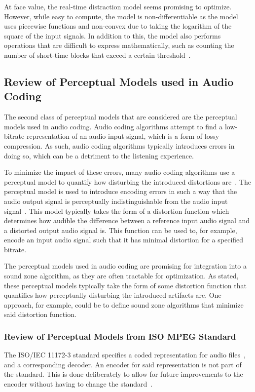 At face value, the real-time distraction model seems promising to optimize.
However, while easy to compute, the model is non-differentiable as the model uses
piecewise functions and non-convex due to taking the logarithm of the square of the input signals.
In addition to this, the model also performs operations that are difficult to express mathematically, such as counting the number of short-time blocks that exceed a certain threshold~\cite{ramo2017real}.

\subsection{Review of Perceptual Models used in Audio Coding}
\label{ch:perceptual:review:audio_coding}
The second class of perceptual models that are considered are the perceptual models used in audio coding.
Audio coding algorithms attempt to find a low-bitrate representation of an audio input signal, which is a 
form of lossy compression.
As such, audio coding algorithms typically introduces errors in doing so, 
which can be a detriment to the listening experience.

To minimize the impact of these errors, many audio coding algorithms use a perceptual model to quantify 
how disturbing the introduced distortions are~\cite{herre2019psychoacoustic}.
The perceptual model is used to introduce encoding errors in such a way that the audio output signal is perceptually indistinguishable from the audio input signal~\cite{taal2012low}.
This model typically takes the form of a distortion function which determines how audible the difference between a reference input audio signal and a distorted output audio signal is.
This function can be used to, for example, encode an input audio signal such that it has minimal distortion for a specified bitrate.

The perceptual models used in audio coding are promising for integration into a sound zone algorithm, as they are often tractable for optimization.
As stated, these perceptual models typically take the form of some distortion function that quantifies how perceptually disturbing the introduced artifacts are. 
One approach, for example, could be to define sound zone algorithms that minimize said distortion function.

\subsubsection{Review of Perceptual Models from ISO MPEG Standard}
The ISO/IEC 11172-3 standard specifies a coded representation for audio files~\cite{ISO11172-3}, 
and a corresponding decoder.
An encoder for said representation is not part of the standard.
This is done deliberately to allow for future improvements to the encoder without having to change the standard~\cite{pan1995tutorial}.

